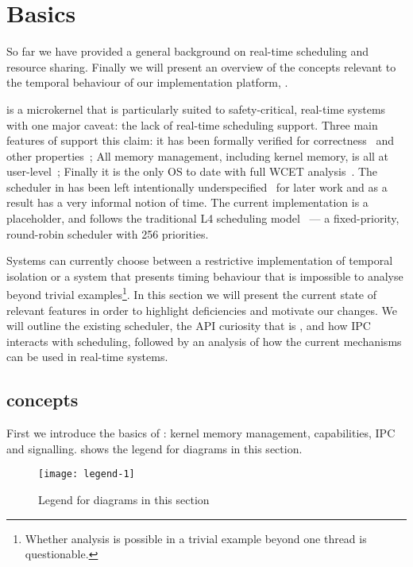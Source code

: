 

\chapter{\selfour Basics}
\label{chap:sel4}

So far we have provided a general background on real-time scheduling and resource sharing.
Finally we will present an overview of the concepts relevant to the temporal behaviour of our implementation platform, \selfour.

\selfour is a microkernel that is particularly suited to safety-critical, real-time systems with one major caveat: the lack of real-time scheduling support. 
Three main features of \selfour support this claim: it has been formally verified for correctness~\citep{Klein_EHACDEEKNSTW_09} and other properties~\citep{Sewell_WGMAK_11}; All memory management, including kernel memory, is all at user-level~\citep{Elkaduwe_Derrin_06}; Finally it is the only \gls{OS} to date with full \gls{WCET} analysis~\citep{Blackham_SCRH_11}.
The scheduler in \selfour has been left intentionally underspecified~\citep{Petters_EH_12} for later work and as a result has a very informal notion of time.
The current implementation is a placeholder, and follows the traditional L4 scheduling model~\citep{Ruocco_06} --- a fixed-priority, round-robin scheduler with 256 priorities.

Systems can currently choose between a restrictive implementation of temporal isolation or a system that presents timing behaviour that is impossible to analyse beyond trivial examples\footnote{Whether analysis is possible in a trivial example beyond one thread is questionable.}.
In this section we will present the current state of relevant \selfour features in order to highlight deficiencies and motivate our changes.
We will outline the existing scheduler, the API curiosity that is \yield, and how \gls{IPC} interacts with scheduling, followed by an analysis of how the current mechanisms can be used in real-time systems.


\section{\selfour concepts}

First we introduce the basics of \selfour: kernel memory management, capabilities, \gls{IPC} and
signalling.  shows the legend for diagrams in this section. 

\begin{figure}
    \centering
    \texttt{[image: legend-1]}
    \caption{Legend for diagrams in this section}
    \label{f:legend-1}
\end{figure}

